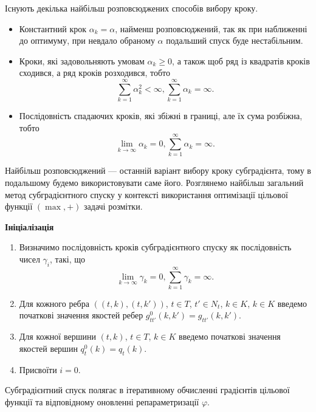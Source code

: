 Існують декілька найбільш розповсюджених способів вибору кроку.
\begin{itemize}
    \item Константний крок $\alpha_k=\alpha$, найменш розповсюджений, так як 
    при наближенні до оптимуму, при невдало обраному $\alpha$ подальший спуск буде нестабільним.
    \item Кроки, які задовольняють умовам
    $\alpha_k\geq 0$, а також щоб ряд із квадратів кроків сходився, а ряд кроків розходився, тобто 
    \begin{equation}
        \sum\limits_{k=1}^{\infty} \alpha_k^2 < \infty, \sum\limits_{k=1}^{\infty} \alpha_k = \infty.
    \end{equation}
    \item Послідовність спадаючих кроків, які збіжні в границі, але їх сума розбіжна, тобто
    \begin{equation}
        \lim\limits_{k\rightarrow\infty}\alpha_k=0, \sum\limits_{k=1}^{\infty} \alpha_k = \infty.
    \end{equation}
  \end{itemize}

Найбільш розповсюджений --- останній варіант вибору кроку субградієнта, тому в подальшому
будемо використовувати саме його.
Розглянемо найбільш загальний метод субградієнтного спуску у контексті 
використання оптимізації цільової функції $(\max,+)$ задачі розмітки.

\textbf{Ініціалізація}

\begin{enumerate}
    \item Визначимо послідовність кроків субградієнтного спуску як послідовність чисел
    $\gamma_i$, такі, що
    \begin{equation}
        \lim\limits_{k\rightarrow\infty}\gamma_k=0, \sum\limits_{k=1}^{\infty} \gamma_k = \infty.
    \end{equation}
    \item Для кожного ребра $((t,k),(t,k'))$, $t\in T$, $t'\in N_t$, $k\in K$, $k\in K$ введемо 
    початкові значення якостей ребер $g^0_{tt'}(k,k')=g_{tt'}(k,k')$.
    \item Для кожної вершини $(t,k)$, $t\in T$, $k\in K$ введемо початкові значення
    якостей вершин $q^0_t(k)=q_t(k)$.
    \item Присвоїти $i=0$.
\end{enumerate}

Субградієнтний спуск полягає в ітеративному обчисленні градієнтів цільової 
функції та відповідному оновленні репараметризації $\varphi$.

